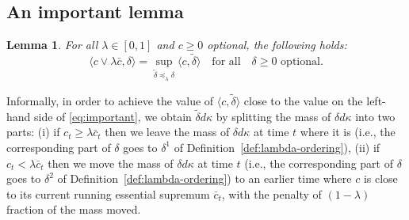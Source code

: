 \documentclass[11pt, oneside]{article}   	%
\theoremstyle{plain}
\newtheorem{lem}[thm]{Lemma}
\theoremstyle{definition}
\theoremstyle{remark}
\begin{document}


\subsection{An important lemma}
\begin{lem}\label{lem:important}
For all $\lambda\in[0,1]$ and $c\geq 0$ optional, the following holds:
\begin{equation}\label{eq:important}
\langle c\vee\lambda\bar{c},\delta\rangle=\sup_{\tilde{\delta}\preceq_\lambda \delta}\langle c,\tilde{\delta}\rangle\quad\text{for all}\quad\delta\geq0\text{ optional}.
\end{equation}
\end{lem}
Informally, in order to achieve the value of  $\langle c,\tilde{\delta}\rangle$ close to the value on the left-hand side of \eqref{eq:important}, we obtain $\tilde\delta d\kappa$ by splitting the mass of $\delta d\kappa$ into two parts: (i) if $c_t\geq\lambda\bar{c}_t$ then we leave the mass of $\delta d\kappa$ at time $t$ where it is (i.e., the corresponding part of $\delta$ goes to $\delta^1$ of Definition~\ref{def:lambda-ordering}), (ii) if $c_t<\lambda\bar{c}_t$ then we move the mass of $\delta d\kappa$ at time $t$ (i.e., the corresponding part of $\delta$ goes to $\delta^2$ of Definition~\ref{def:lambda-ordering}) to an earlier time where $c$ is close to its current running essential supremum $\bar{c}_t$, with the penalty of $(1-\lambda)$ fraction of the mass moved. 
\end{document}
